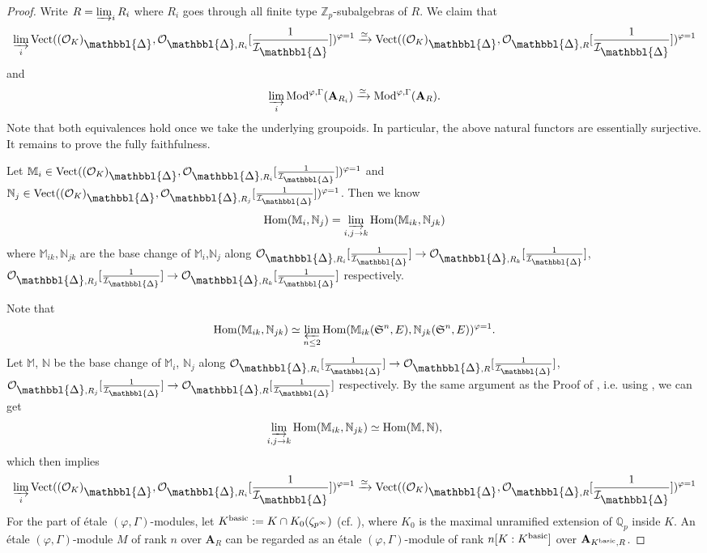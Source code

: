 \documentclass[10pt]{article}
\numberwithin{equation}{section}
\newcommand{\frakS}{{\mathfrak S}}
\newcommand{\bM}{{\mathbb M}}
\newcommand{\bN}{{\mathbb N}}
\newcommand{\bQ}{{\mathbb Q}}
\newcommand{\bZ}{{\mathbb Z}}
\newcommand{\calI}{{\mathcal I}}
\newcommand{\calO}{{\mathcal O}}
\newcommand{\Hom}{{\mathrm{Hom}}}           %
\newcommand{\Mod}{{\mathrm{Mod}}}           %
\newcommand{\Vect}{{\mathrm{Vect}}}         %
\newcommand{\bfA}{{\textbf{A}}}
\newcommand{\Prism}{{\mathlarger{\mathbbl{\Delta}}}} %
\begin{document}
\begin{proof}
    Write $R=\varinjlim_iR_i$ where $R_i$ goes through all finite type $\bZ_p$-subalgebras of $R$. We claim that 
    \[
     \varinjlim_i\Vect((\calO_K)_{\Prism},\calO_{\Prism,R_i}[\frac{1}{\calI_{\Prism}}])^{\varphi=1}\xrightarrow{\simeq}\Vect((\calO_K)_{\Prism},\calO_{\Prism,R}[\frac{1}{\calI_{\Prism}}])^{\varphi=1}
    \]
    and
    \[
     \varinjlim_i\Mod^{\varphi,\Gamma}(\bfA_{R_i})\xrightarrow{\simeq}\Mod^{\varphi,\Gamma}(\bfA_{R}).
    \]
    Note that both equivalences hold once we take the underlying groupoids. In particular, the above natural functors are essentially surjective. It remains to prove the fully faithfulness.

    Let $\bM_i\in \Vect((\calO_K)_{\Prism},\calO_{\Prism,R_i}[\frac{1}{\calI_{\Prism}}])^{\varphi=1}$ and $\bN_j\in \Vect((\calO_K)_{\Prism},\calO_{\Prism,R_j}[\frac{1}{\calI_{\Prism}}])^{\varphi=1}$. Then we know \[
    \Hom(\bM_i,\bN_j)=\varinjlim_{i,j\to k}\Hom(\bM_{ik},\bN_{jk})\]
    where $\bM_{ik},\bN_{jk}$ are the base change of $\bM_i$,$\bN_j$ along $\calO_{\Prism,R_i}[\frac{1}{\calI_{\Prism}}]\to \calO_{\Prism,R_k}[\frac{1}{\calI_{\Prism}}]$, $\calO_{\Prism,R_j}[\frac{1}{\calI_{\Prism}}]\to \calO_{\Prism,R_k}[\frac{1}{\calI_{\Prism}}]$ respectively.

    Note that 
    \[
    \Hom(\bM_{ik},\bN_{jk})\simeq \varprojlim_{n\leq 2} \Hom(\bM_{ik}(\frakS^n,E),\bN_{jk}(\frakS^n,E))^{\varphi=1}.
    \]
    Let $\bM$, $\bN$ be the base change of $\bM_i$, $\bN_j$ along $\calO_{\Prism,R_i}[\frac{1}{\calI_{\Prism}}]\to \calO_{\Prism,R}[\frac{1}{\calI_{\Prism}}]$, $\calO_{\Prism,R_j}[\frac{1}{\calI_{\Prism}}]\to \calO_{\Prism,R}[\frac{1}{\calI_{\Prism}}]$ respectively. By the same argument as the Proof of \cite[Lemma 2.29]{Min23}, i.e. using \cite[Lemma 2.24]{Min23}, we can get
    \[
    \varinjlim_{i,j\to k}\Hom(\bM_{ik},\bN_{jk})\simeq \Hom(\bM,\bN),
    \]
    which then implies
    \[
     \varinjlim_i\Vect((\calO_K)_{\Prism},\calO_{\Prism,R_i}[\frac{1}{\calI_{\Prism}}])^{\varphi=1}\xrightarrow{\simeq}\Vect((\calO_K)_{\Prism},\calO_{\Prism,R}[\frac{1}{\calI_{\Prism}}])^{\varphi=1}
    \]
    For the part of \'etale $(\varphi,\Gamma)$-modules, let $K^{\rm basic}:=K\cap K_0(\zeta_{p^{\infty}})$ (cf. \cite[Definition 3.2.3]{EG22}), where $K_0$ is the maximal unramified extension of $\bQ_p$ inside $K$. An \'etale $(\varphi,\Gamma)$-module $M$ of rank $n$ over $\bfA_{R}$ can be regarded as an \'etale $(\varphi,\Gamma)$-module of rank $n[K:K^{\rm basic}]$ over $\bfA_{K^{\rm basic},R}$.



\end{proof}
\end{document}

